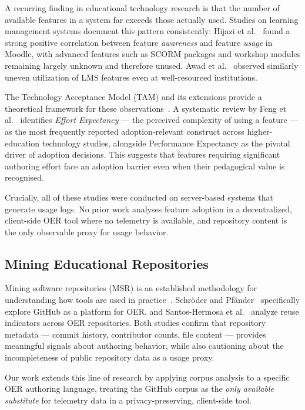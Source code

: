 A recurring finding in educational technology research is that the number of
available features in a system far exceeds those
actually used.
Studies on learning management systems document this pattern consistently:
Hijazi et al.~\cite{Hijazi2020} found a strong positive correlation between
feature \emph{awareness} and feature \emph{usage} in Moodle, with advanced
features such as SCORM packages and workshop modules remaining largely unknown
and therefore unused.
Awad et al.~\cite{Awad2019} observed similarly uneven utilization of LMS
features even at well-resourced institutions.

The Technology Acceptance Model (TAM) and its extensions provide a theoretical
framework for these observations~\cite{Granic2022}.
A systematic review by Feng et al.~\cite{Feng2025} identifies \emph{Effort
Expectancy} --- the perceived complexity of using a feature --- as the most
frequently reported adoption-relevant construct across higher-education
technology studies, alongside Performance Expectancy as the pivotal driver
of adoption decisions.
This suggests that features requiring significant authoring effort face
an adoption barrier even when their pedagogical value is recognised.

Crucially, all of these studies were conducted on server-based systems that
generate usage logs.
No prior work analyses feature adoption in a decentralized, client-side OER
tool where no telemetry is available, and repository content is the only
observable proxy for usage behavior.

\subsection{Mining Educational Repositories}
\label{sec:rw:mining}

Mining software repositories (MSR) is an established methodology for
understanding how tools are used in practice~\cite{Cosentino2017,Cosentino2016}.
Schröder and Pfänder~\cite{Schroeder2020} specifically explore GitHub as a
platform for OER, and Santos-Hermosa et al.~\cite{SantosHermosa2017} analyze
reuse indicators across OER repositories.
Both studies confirm that repository metadata --- commit history, contributor
counts, file content --- provides meaningful signals about authoring behavior,
while also cautioning about the incompleteness of public repository data as a
usage proxy.

Our work extends this line of research by applying corpus analysis to a
specific OER authoring language, treating the GitHub corpus as the \emph{only
available substitute} for telemetry data in a privacy-preserving,
client-side tool.
